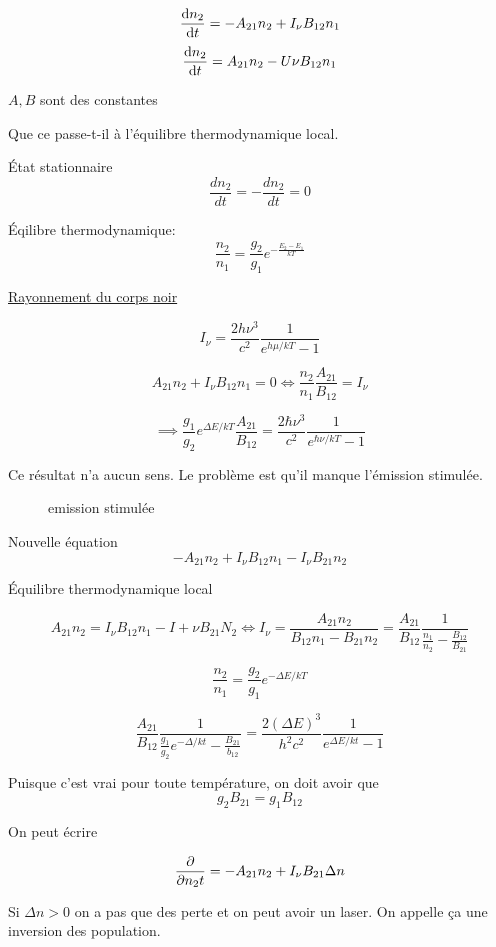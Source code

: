 $$\dv{n_{2}}{t} = -A_{21} n_2 + I_{\nu} B_{12} n_1$$ 
$$\dv{n_2 }{t} = A_{21} n_2 - U\nu B_{12} n_1$$ 

$A,B$ sont des constantes 

Que ce passe-t-il à l'équilibre thermodynamique local.

État stationnaire $$\frac{d {n_2}}{d {t}} = - \frac{d {n_2}}{d {t}} =0$$ 

Éqilibre thermodynamique: $$\frac{n_2}{n_1} = \frac{g_2}{g_1} e^{-\frac{E_2-E_1}{kT} }$$ 


\underline{Rayonnement du corps noir} 

$$I_{\nu} = \frac{2h\nu^{3}}{c^{2}} \frac{1}{e^{h\mu/kT}-1}  $$ 

$$A_{21} n_2 + I_{\nu} B_{12} n_1 =0 \iff \frac{n_2}{n_1} \frac{A_{21}}{ B_{12}} = I_{\nu} $$ 

$$\implies \frac{g_1}{g_2} e^{\Delta E/ kT } \frac{A_{21}}{B_{12}} = \frac{2\hbar\nu^{3}}{c^2} \frac{1}{e^{\hbar\nu/kT} -1} $$ 

Ce résultat n'a aucun sens. Le problème est qu'il manque l'émission stimulée. 

\begin{figure}[ht]
    \centering
    \caption{emission stimulée}
    \label{fig:emission-stimulée}
\end{figure}

Nouvelle équation
$$ - A_{21} n_2 + I_{\nu} B_{12} n_1 -I_{\nu} B_{21} n_2$$ 

Équilibre thermodynamique local

$$A_{21} n_2 = I_{\nu} B_{12} n_1 - I+\nu B_{21} N_2 \iff I_{\nu} = \frac{A_{21} n_{2}}{{B_12} n_1 -B_{21} n_{2}}= \frac{A_{21}}{B_{12}} \frac{1}{\frac{n_1}{n_2} - \frac{B_{12}}{B_{21}} }  $$ 

$$\frac{n_2}{n_1} = \frac{g_2}{g_1} e^{-\Delta E /kT}$$ 

$$\frac{A_{21}}{B_{12}} \frac{1}{\frac{g_1}{g_2} e^{-\Delta/ kt} - \frac{B_{21} }{b_12} }  = \frac{2(\Delta{}E)^3}{h^2c^2} \frac{1}{e^{\Delta E/kt}-1} $$ 


Puisque c'est vrai pour toute température, on doit avoir que $$g_2 B_{21} = g_1 B_{12} $$ 

On peut écrire 

$$\pdv{n_{2}{t}} = -A_{21} n_2 + I_{\nu} B_{21} \Delta n$$

Si $\Delta n > 0$ on a pas que des perte et on peut avoir un laser. On appelle ça une inversion des population. 
\setcounter{subsection}{4}

